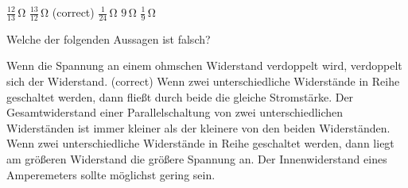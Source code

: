 \documentclass[11pt]{exam}
\begin{document}
\begin{questions}
\begin{choices}
	\choice \(\mathrm{\frac{12}{13}\,\Omega}\)
	\choice \(\mathrm{\frac{13}{12}\,\Omega}\) (correct)
	\choice \(\mathrm{\frac{1}{24}\,\Omega}\)
	\choice \(\mathrm{9\,\Omega}\)
	\choice \(\mathrm{\frac{1}{9}\,\Omega}\)
\end{choices}

\vspace{3mm}\question Welche der folgenden Aussagen ist falsch?

\begin{choices}
	\choice Wenn die Spannung an einem ohmschen Widerstand verdoppelt wird, verdoppelt sich der Widerstand. (correct)
	\choice Wenn zwei unterschiedliche Widerstände in Reihe geschaltet werden, dann fließt durch beide die gleiche Stromstärke.
	\choice Der Gesamtwiderstand einer Parallelschaltung von zwei unterschiedlichen Widerständen ist immer kleiner als der kleinere von den beiden Widerständen.
	\choice Wenn zwei unterschiedliche Widerstände in Reihe geschaltet werden, dann liegt am größeren Widerstand die größere Spannung an.
	\choice Der Innenwiderstand eines Amperemeters sollte möglichst gering sein.
\end{choices}

\vspace{3mm}\end{questions}
\end{document}
